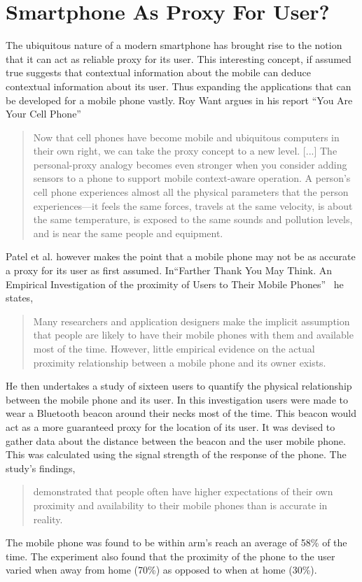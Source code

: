 \section{Smartphone As Proxy For User?} %
\label{sec:section_proxy}
The ubiquitous nature of a modern smartphone has brought rise to the notion that it can act as reliable proxy for its user.  This interesting concept, if assumed true suggests that contextual information about the mobile can deduce contextual information about its user. Thus expanding the applications that can be developed for a mobile phone vastly. Roy Want argues in his report ``You Are Your Cell Phone''~\cite{want2008cellphone}
\begin{quote}
Now that cell phones have become mobile and ubiquitous computers in their own right, we can take the proxy concept to a new  level. [...] The personal-proxy analogy becomes even stronger when you consider adding sensors to a phone to support mobile  context-aware operation. A person’s cell phone experiences almost all the physical parameters that the person experiences—it feels the same forces, travels at the same velocity, is about the same temperature, is exposed to the same sounds and pollution levels, and is near the same people and equipment.
\end{quote}
Patel et al. however makes the point that a mobile phone may not be as accurate a proxy for its user as first assumed.  In``Farther Thank You May Think. An Empirical Investigation of the proximity of Users to Their Mobile Phones''~\cite{patel2006farther} he states, 
\begin{quote}
Many researchers and application designers make the implicit assumption that people are likely to have their mobile phones with them and available most of the time. However, little empirical evidence on the actual proximity relationship between a mobile phone and its owner exists.
\end{quote}
He then undertakes a study of sixteen users to quantify the physical relationship between the mobile phone and its user. In this investigation users were made to wear a Bluetooth beacon around their necks most of the time. This beacon would act as a more guaranteed proxy for the location of its user. It was devised to gather data about the distance between the beacon and the user mobile phone. This was calculated using the signal strength of the response of the phone. The study’s findings,
\begin{quote}
demonstrated that people often have higher expectations of their own proximity and availability to their mobile phones than is accurate in reality.
\end{quote}
The mobile phone was found to be within arm’s reach an average of 58\% of the
time. The experiment also found that the proximity of the phone to the user varied when away from home (70\%) as opposed to when at home (30\%).


